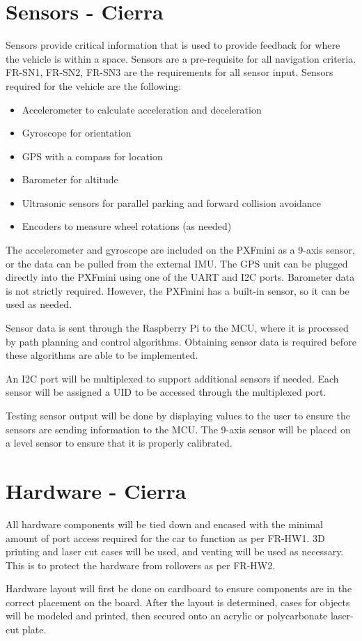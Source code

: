 \documentclass[compsoc,draftclsnofoot,onecolumn,10pt]{IEEEtran}
\begin{document}
\section{Sensors - Cierra}
Sensors provide critical information that is used to provide feedback for where the vehicle is within a space. Sensors are a pre-requisite for all navigation criteria. FR-SN1, FR-SN2, FR-SN3 are the requirements for all sensor input. 
Sensors required for the vehicle are the following:
\begin{itemize}
\item Accelerometer to calculate acceleration and deceleration 
\item Gyroscope for orientation
\item GPS with a compass for location
\item Barometer for altitude 
\item Ultrasonic sensors for parallel parking and forward collision avoidance
\item Encoders to measure wheel rotations (as needed)
\end{itemize}

The accelerometer and gyroscope are included on the PXFmini as a 9-axis sensor, or the data can be pulled from the external IMU.  
The GPS unit can be plugged directly into the PXFmini using one of the UART and I2C ports. 
Barometer data is not strictly required. However, the PXFmini has a built-in sensor, so it can be used as needed.\par

Sensor data is sent through the Raspberry Pi to the MCU, where it is processed by path planning and control algorithms. Obtaining sensor data is required before these algorithms are able to be implemented. \par

An I2C port will be multiplexed to support additional sensors if needed. 
Each sensor will be assigned a UID to be accessed through the multiplexed port. \par

Testing sensor output will be done by displaying values to the user to ensure the sensors are sending information to the MCU. The 9-axis sensor will be placed on a level sensor to ensure that it is properly calibrated. \par

\section{Hardware - Cierra}
All hardware components will be tied down and encased with the minimal amount of port access required for the car to function as per FR-HW1. 3D printing and laser cut cases will be used, and venting will be used as necessary. This is to protect the hardware from rollovers as per FR-HW2. \par
Hardware layout will first be done on cardboard to ensure components are in the correct placement on the board. 
After the layout is determined, cases for objects will be modeled and printed, then secured onto an acrylic or polycarbonate laser-cut plate. \par
\end{document}
